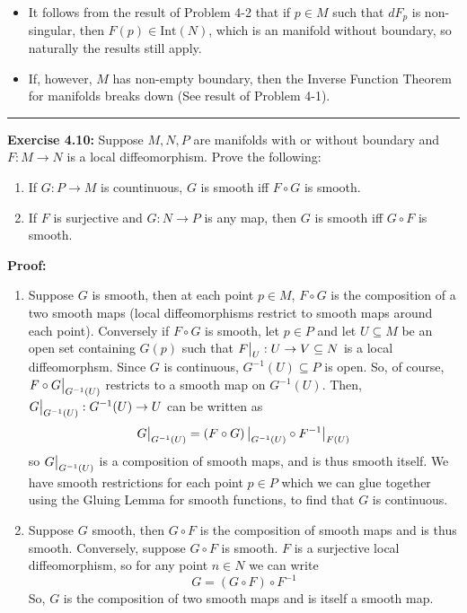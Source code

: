 \documentclass{article}
\newcommand{\restr}[2]{{%
  \left.\kern-\nulldelimiterspace %
  #1 %
  \vphantom{\big|} %
  \right|_{#2} %
  }}
\begin{document}
\begin{itemize}
  \item  It follows from the result of Problem 4-2 that if $p \in M$ such that $dF_p$ is non-singular, then $F(p) \in \mathrm{Int}(N)$, which is an manifold without boundary, so naturally the results still apply. 
  
  \item If, however, $M$ has non-empty boundary, then the Inverse Function Theorem for manifolds breaks down (See result of Problem 4-1).
\end{itemize}

\vskip 0.5cm
\hrule
\vskip 0.5cm


\textbf{Exercise 4.10:} Suppose $M, N, P$ are manifolds with or without boundary and $F : M \rightarrow N$ is a local diffeomorphism. Prove the following:
\begin{enumerate}[label=(\alph*)]
  \item If $G : P \rightarrow M$ is countinuous, $G$ is smooth iff $F \circ G$ is smooth.
  \item If $F$ is surjective and $G : N \rightarrow P$ is any map, then $G$ is smooth iff $G \circ F$ is smooth.
\end{enumerate} 
\vskip 0.5cm

\textbf{Proof:}

\begin{enumerate}[label=(\alph*)]
  \item Suppose $G$ is smooth, then at each point $p \in M$, $F \circ G$ is the composition of a two smooth maps (local diffeomorphisms restrict to smooth maps around each point). Conversely if $F \circ G$ is smooth, let $p \in P$ and let $U \subseteq M$ be an open set containing $G(p)$ such that $\restr{F}{U} : U \rightarrow V \subseteq N$ is a local diffeomorphsm. Since $G$ is continuous, $G^{-1}(U) \subseteq P$ is open. So, of course, $\restr{F \circ G}{G^{-1}(U)}$ restricts to a smooth map on $G^{-1}(U)$. Then, $\restr{G}{G^{-1}(U)} : G^{-1}(U) \rightarrow U$ can be written as 
  \[ \restr{G}{G^{-1}(U)} = \restr{\left(F \circ G\right)}{G^{-1}(U)} \circ \restr{F^{-1}}{F(U)} \]
  so $\restr{G}{G^{-1}(U)}$ is a composition of smooth maps, and is thus smooth itself. We have smooth restrictions for each point $p \in P$ which we can glue together using the Gluing Lemma for smooth functions, to find that $G$ is continuous.

  \vskip 0.5cm
  \item Suppose $G$ smooth, then $G \circ F$ is the composition of smooth maps and is thus smooth. Conversely, suppose $G \circ F$ is smooth. $F$ is a surjective local diffeomorphism, so for any point $n \in N$ we can write 
  \[ G = \left( G \circ F \right) \circ F^{-1}   \]
  So, $G$ is the composition of two smooth maps and is itself a smooth map.
\end{enumerate}
\end{document}
